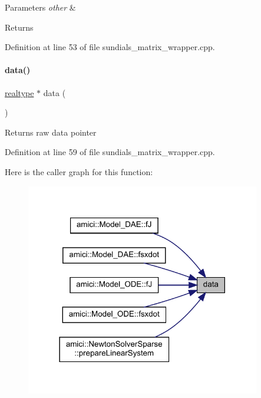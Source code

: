 \begin{DoxyParams}{Parameters}
{\em other} & \\
\hline
\end{DoxyParams}
\begin{DoxyReturn}{Returns}

\end{DoxyReturn}


Definition at line 53 of file sundials\+\_\+matrix\+\_\+wrapper.\+cpp.

\mbox{\label{classamici_1_1_sls_mat_wrapper_ace31bbb9df6dd42f70286108ecafa01b}} 
\paragraph{\texorpdfstring{data()}{data()}}
{\footnotesize\ttfamily \mbox{\hyperlink{namespaceamici_a1bdce28051d6a53868f7ccbf5f2c14a3}{realtype}} $\ast$ data (\begin{DoxyParamCaption}{ }\end{DoxyParamCaption})}

\begin{DoxyReturn}{Returns}
raw data pointer 
\end{DoxyReturn}


Definition at line 59 of file sundials\+\_\+matrix\+\_\+wrapper.\+cpp.

Here is the caller graph for this function\+:
\nopagebreak
\begin{figure}[H]
\begin{center}
\leavevmode
\includegraphics[width=290pt]{classamici_1_1_sls_mat_wrapper_ace31bbb9df6dd42f70286108ecafa01b_icgraph}
\end{center}
\end{figure}
\mbox{\label{classamici_1_1_sls_mat_wrapper_ae1d2d562c699946445244cca406c4994}} 
